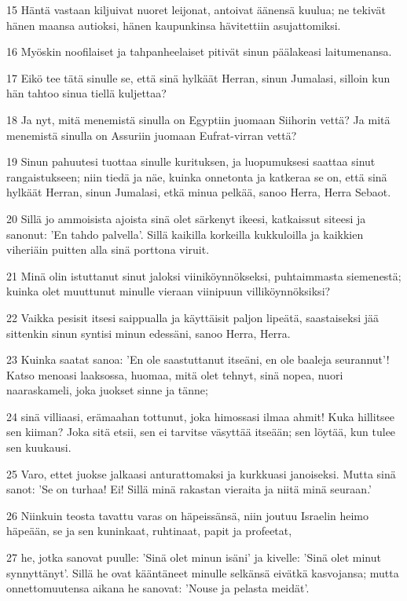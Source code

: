 \par 15 Häntä vastaan kiljuivat nuoret leijonat, antoivat äänensä kuulua; ne tekivät hänen maansa autioksi, hänen kaupunkinsa hävitettiin asujattomiksi.
\par 16 Myöskin noofilaiset ja tahpanheelaiset pitivät sinun päälakeasi laitumenansa.
\par 17 Eikö tee tätä sinulle se, että sinä hylkäät Herran, sinun Jumalasi, silloin kun hän tahtoo sinua tiellä kuljettaa?
\par 18 Ja nyt, mitä menemistä sinulla on Egyptiin juomaan Siihorin vettä? Ja mitä menemistä sinulla on Assuriin juomaan Eufrat-virran vettä?
\par 19 Sinun pahuutesi tuottaa sinulle kurituksen, ja luopumuksesi saattaa sinut rangaistukseen; niin tiedä ja näe, kuinka onnetonta ja katkeraa se on, että sinä hylkäät Herran, sinun Jumalasi, etkä minua pelkää, sanoo Herra, Herra Sebaot.
\par 20 Sillä jo ammoisista ajoista sinä olet särkenyt ikeesi, katkaissut siteesi ja sanonut: 'En tahdo palvella'. Sillä kaikilla korkeilla kukkuloilla ja kaikkien viheriäin puitten alla sinä porttona viruit.
\par 21 Minä olin istuttanut sinut jaloksi viiniköynnökseksi, puhtaimmasta siemenestä; kuinka olet muuttunut minulle vieraan viinipuun villiköynnöksiksi?
\par 22 Vaikka pesisit itsesi saippualla ja käyttäisit paljon lipeätä, saastaiseksi jää sittenkin sinun syntisi minun edessäni, sanoo Herra, Herra.
\par 23 Kuinka saatat sanoa: 'En ole saastuttanut itseäni, en ole baaleja seurannut'! Katso menoasi laaksossa, huomaa, mitä olet tehnyt, sinä nopea, nuori naaraskameli, joka juokset sinne ja tänne;
\par 24 sinä villiaasi, erämaahan tottunut, joka himossasi ilmaa ahmit! Kuka hillitsee sen kiiman? Joka sitä etsii, sen ei tarvitse väsyttää itseään; sen löytää, kun tulee sen kuukausi.
\par 25 Varo, ettet juokse jalkaasi anturattomaksi ja kurkkuasi janoiseksi. Mutta sinä sanot: 'Se on turhaa! Ei! Sillä minä rakastan vieraita ja niitä minä seuraan.'
\par 26 Niinkuin teosta tavattu varas on häpeissänsä, niin joutuu Israelin heimo häpeään, se ja sen kuninkaat, ruhtinaat, papit ja profeetat,
\par 27 he, jotka sanovat puulle: 'Sinä olet minun isäni' ja kivelle: 'Sinä olet minut synnyttänyt'. Sillä he ovat kääntäneet minulle selkänsä eivätkä kasvojansa; mutta onnettomuutensa aikana he sanovat: 'Nouse ja pelasta meidät'.

